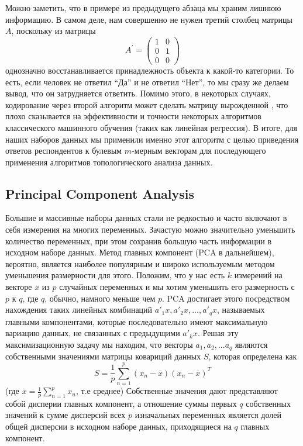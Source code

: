 Можно заметить, что в примере из предыдущего абзаца мы храним лишнюю информацию.
В самом деле, нам совершенно не нужен третий столбец матрицы $A$, поскольку из матрицы
\[
    A^{\prime} = \begin{pmatrix}
        1 & 0 \\
        0 & 1 \\
        0 & 0
    \end{pmatrix}
\]
однозначно восстанавливается принадлежность объекта к какой-то категории.
То есть, если человек не ответил \enquote{Да} и не ответил \enquote{Нет}, то мы сразу же делаем вывод, что он затрудняется ответить.
Помимо этого, в некоторых случаях, кодирование через второй алгоритм может сделать матрицу вырожденной \cite{feature-eng-sel}, что плохо сказывается на эффективности и точности некоторых алгоритмов классического машинного обучения (таких как линейная регрессия).
В итоге, для наших наборов данных мы применили именно этот алгоритм с целью приведения ответов респондентов к булевым $m$-мерным векторам для последующего применения алгоритмов топологического анализа данных.
\subsection{Principal Component Analysis}

Большие и массивные наборы данных стали не редкостью и часто включают в себя измерения на многих переменных. 
Зачастую можно значительно уменьшить количество переменных, при этом сохранив большую часть информации в исходном наборе данных. 
Метод  главных компонент (PCA в дальнейшем), вероятно, является наиболее популярным и широко используемым методом уменьшения размерности для этого. 
Положим, что у нас есть $k$ измерений на векторе $x$ из $p$ случайных переменных и мы хотим уменьшить его размерность с $p$ к $q$, где $q$, обычно, намного меньше чем $p$. 
PCA достигает этого посредством нахождения таких линейных комбинаций $a'_1x, a'_2x, ..., a'_qx$, называемых главными компонентами, которые последовательно имеют максимальную вариацию данных, не связанных с предыдущими $a'_kx$. Решая эту максимизационную задачу мы находим, что векторы $a_1, a_2, ... a_q$ являются собственными значениями матрицы ковариций данных $S$, которая определена как 
    $$S = \frac{1}{p} \sum_{n = 1}^p(x_n - \overline{x})(x_n - \overline{x})^T$$
(где $\overline{x} = \frac{1}{p}\sum_{n = 1}^p x_n$, т.е среднее)
Собственные значения дают представляют собой дисперии главных компонент, а отношение суммы первых $q$ собственных значений к сумме дисперсий всех $p$ изначальных переменных является долей общей дисперсии в исходном наборе данных, приходящиеся на $q$ главных компонент. \\
\newpage
\renewcommand{\thesubsubsection}{Пример}
